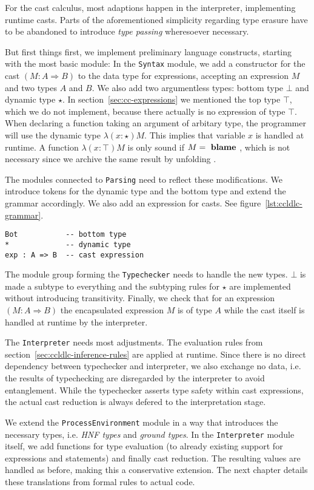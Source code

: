 For the cast calculus, most adaptions happen in the interpreter, implementing runtime casts. Parts of the aforementioned simplicity regarding type erasure have to be abandoned to introduce \emph{type passing} wheresoever necessary.

But first things first, we implement preliminary language constructs, starting with the most basic module: In the \texttt{Syntax} module, we add a constructor for the cast $(M : A \Rightarrow B)$ to the data type for expressions, accepting an expression $M$ and two types $A$ and $B$. We also add two argumentless types: bottom type $\bot$ and dynamic type $\star$. In section~\ref{sec:cc-expressions} we mentioned the top type $\top$, which we do not implement, because there actually is no expression of type $\top$. When declaring a function taking an argument of arbitary type, the programmer will use the dynamic type $\lambda(x:\star)M$. This implies that variable $x$ is handled at runtime. A function $\lambda(x:\top)M$ is only sound if $M = \text{ \textbf{blame} }$, which is not necessary since we archive the same result by unfolding .

The modules connected to \texttt{Parsing} need to reflect these modifications. We introduce tokens for the dynamic type and the bottom type and extend the grammar accordingly. We also add an expression for casts. See figure~\ref{lst:ccldlc-grammar}.

\begin{lstlisting}[language=ldgv,caption=New language constructs for CCLDLC,label=lst:ccldlc-grammar]
Bot           -- bottom type
*             -- dynamic type
exp : A => B  -- cast expression
\end{lstlisting}

The module group forming the \texttt{Typechecker} needs to handle the new types. $\bot$ is made a subtype to everything and the subtyping rules for $\star$ are implemented without introducing transitivity. Finally, we check that for an expression $(M : A \Rightarrow B)$ the encapsulated expression $M$ is of type $A$ while the cast itself is handled at runtime by the interpreter.

The \texttt{Interpreter} needs most adjustments. The evaluation rules from section~\ref{sec:ccldlc-inference-rules} are applied at runtime. Since there is no direct dependency between typechecker and interpreter, we also exchange no data, i.e. the results of typechecking are disregarded by the interpreter to avoid entanglement. While the typechecker asserts type safety within cast expressions, the actual cast reduction is always defered to the interpretation stage.

We extend the \texttt{ProcessEnvironment} module in a way that introduces the necessary types, i.e. \emph{HNF types} and \emph{ground types}. In the \texttt{Interpreter} module itself, we add functions for type evaluation (to already existing support for expressions and statements) and finally cast reduction. The resulting values are handled as before, making this a conservative extension. The next chapter details these translations from formal rules to actual code.
